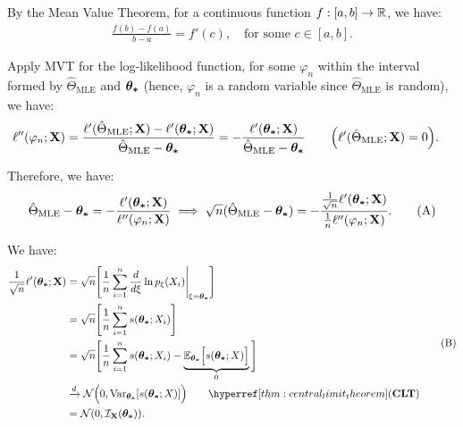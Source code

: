 \begin{proof*}
    By the Mean Value Theorem, for a continuous function $f:[a, b] \to \mathbb{R}$, we have:
    \begin{align*}
        \frac{f(b) - f(a)}{b - a} = f'(c), \quad \text{for some } c\in [a,b]. 
    \end{align*} 

    \noindent Apply MVT for the log-likelihood function, for some $\varphi_n$ within the interval formed by $\hat\Theta_\mathrm{MLE}$ and $\boldsymbol{\theta_*}$ (hence, $\varphi_n$ is a random variable since $\hat\Theta_\mathrm{MLE}$ is random), we have:
    \begin{align*}
         \ell''(\varphi_n;{\bf X}) &= \frac{\ell'(\hat\Theta_\mathrm{MLE};{\bf X}) - \ell'(\boldsymbol{\theta_*};{\bf X})}{\hat\Theta_\mathrm{MLE} - \boldsymbol{\theta_*}} = -\frac{\ell'(\boldsymbol{\theta_*};{\bf X})}{\hat\Theta_\mathrm{MLE} - \boldsymbol{\theta_*}} \qquad \Big( \ell'(\hat\Theta_\mathrm{MLE};{\bf X}) = 0 \Big).
    \end{align*} 

    \noindent Therefore, we have:
    \begin{equation}
        \label{eq:asympt_normality_mle_mvt}
        \hat\Theta_\mathrm{MLE} - \boldsymbol{\theta_*} = -\frac{\ell'(\boldsymbol{\theta_*};{\bf X})}{\ell''(\varphi_n;{\bf X})}\implies \sqrt{n}(\hat\Theta_\mathrm{MLE} - \boldsymbol{\theta_*}) = -\frac{\frac{1}{\sqrt n} \ell'(\boldsymbol{\theta_*};{\bf X})}{\frac{1}{n}\ell''(\varphi_n;{\bf X})}.\tag{A}
    \end{equation} 

    \noindent We have:
    \begin{equation}
    \label{eq:asympt_normality_mle_numerator}
    \begin{aligned}
        \frac{1}{\sqrt n}\ell'(\btheta;\bX) &= \sqrt{n}\biggSquare{\frac{1}{n}\sum_{i=1}^n \frac{d}{d\xi}\ln p_{\xi}(X_i)\Bigg|_{\xi=\btheta}} \\
        &= \sqrt{n} \biggSquare{
            \frac{1}{n}\sum_{i=1}^n s(\btheta;X_i)
        } \\
        &= \sqrt{n} \biggSquare{
            \frac{1}{n}\sum_{i=1}^n s(\btheta;X_i) - \underbrace{\E_{\btheta}\bigSquare{s(\btheta;X)}}_{0}
        } \\
        &\xrightarrow{d} \mathcal{N}\bigRound{0, \mathrm{Var}_{\btheta}[s(\btheta; X)]} \qquad\CLT \\
        &= \mathcal{N}(0, \mathcal{I}_{\bX}(\btheta)).
    \end{aligned}
    \tag{B}
    \end{equation} 


\end{proof*}
